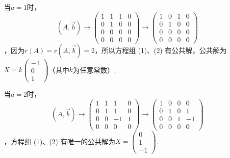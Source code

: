 \documentclass[12pt,fontset=fandol]{ctexart}
\begin{document}
\begin{solve}
        当$a=1$时，
\[(A,\vec{b})\rightarrow\begin{pmatrix}
                1 & 1 & 1 & 0 \\
                0 & 1 & 0 & 0 \\
                0 & 0 & 0 & 0 \\
                0 & 0 & 0 & 0
            \end{pmatrix}\rightarrow\begin{pmatrix}
                1 & 0 & 1 & 0 \\
                0 & 1 & 0 & 0 \\
                0 & 0 & 0 & 0 \\
                0 & 0 & 0 & 0
            \end{pmatrix}\]
，因为$r(A)=r(A,\vec{b})=2$，所以方程组 (1)、(2) 有公共解，公共解为$X=k\begin{pmatrix} -1 \\ 0  \\ 1 \end{pmatrix}$（其中$k$为任意常数）.

        当$a=2$时，
\[(A,\vec{b})\rightarrow\begin{pmatrix}
                1 & 1 & 1  & 0 \\
                0 & 1 & 1  & 0 \\
                0 & 0 & -1 & 1 \\
                0 & 0 & 0  & 0
            \end{pmatrix}\rightarrow\begin{pmatrix}
                1 & 0 & 0 & 0  \\
                0 & 1 & 0 & 1  \\
                0 & 0 & 1 & -1 \\
                0 & 0 & 0 & 0
            \end{pmatrix}\]
，方程组 (1)、(2) 有唯一的公共解为$X=\begin{pmatrix}
                0 \\
                1 \\
                -1
            \end{pmatrix}$.
\end{solve}
\end{document}
